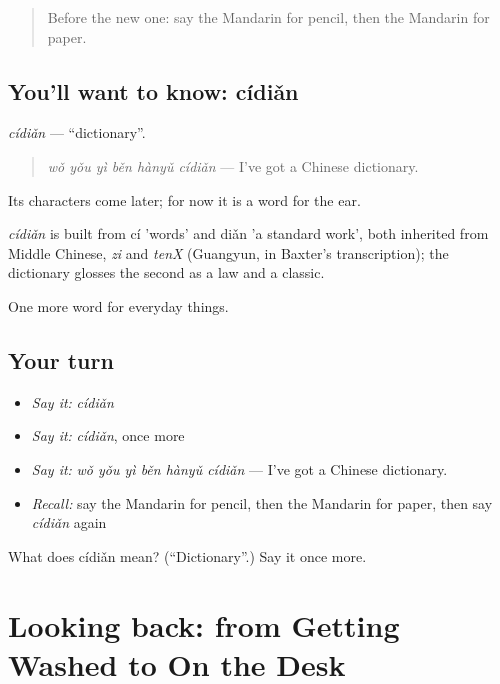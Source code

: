 \begin{quote}
Before the new one: say the Mandarin for pencil, then the Mandarin for paper.
\end{quote}

\subsection*{You'll want to know: cídiǎn}
\emph{cídiǎn} — \textquotedblleft{}dictionary\textquotedblright{}.

\begin{quote}
\emph{wǒ yǒu yì běn hànyǔ cídiǎn} — I've got a Chinese dictionary.
\end{quote}

Its characters come later; for now it is a word for the ear.

\begin{cousinweb}
\emph{cídiǎn} is built from cí 'words' and diǎn 'a standard work', both inherited from Middle Chinese, \emph{zi} and \emph{tenX} (Guangyun, in Baxter's transcription); the dictionary glosses the second as a law and a classic.
\end{cousinweb}

\begin{grammarlens}[title={What you've built}]
One more word for everyday things.
\end{grammarlens}

\subsection*{Your turn}
\begin{itemize}
\raggedright
  \item \emph{Say it:} \emph{cídiǎn}
  \item \emph{Say it:} \emph{cídiǎn}, once more
  \item \emph{Say it:} \emph{wǒ yǒu yì běn hànyǔ cídiǎn} — I've got a Chinese dictionary.
  \item \emph{Recall:} say the Mandarin for pencil, then the Mandarin for paper, then say \emph{cídiǎn} again
\end{itemize}

\begin{tcolorbox}[breakable,colback=teal!4,colframe=teal!35!black,title={Before you move on}]
What does cídiǎn mean? (\textquotedblleft{}Dictionary\textquotedblright{}.) Say it once more.
\end{tcolorbox}
\section[(dialogue)]{Looking back: from Getting Washed to On the Desk}

